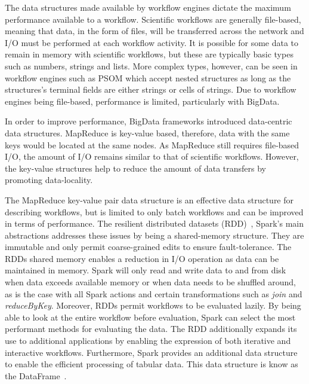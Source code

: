 \documentclass{report}
\begin{document}
                The data structures made available by workflow engines dictate
                the maximum performance available to a workflow. Scientific
                workflows are generally file-based, meaning that data, in the 
                form of files, will be 
                transferred across the network and I/O must be
                performed at each workflow activity. It is possible for some 
                data to remain in memory with scientific workflows, but these 
                are typically basic types such as numbers, strings and lists.
                More complex types, however, can be seen in workflow engines 
                such as PSOM which accept nested structures as long as the
                structures's terminal fields are either strings or cells of 
                strings. Due to workflow engines being file-based, performance
                is limited, particularly with BigData.
                
                In order to improve performance, BigData frameworks introduced
                data-centric data structures. MapReduce is key-value based, 
                therefore, data with the same keys would be located at the
                same nodes. As MapReduce still requires file-based I/O, the 
                amount of I/O remains similar to that of scientific workflows. 
                However, the key-value structures help to reduce the amount 
                of data transfers by promoting data-locality.

                The MapReduce key-value pair data structure is an effective 
                data structure for describing workflows, but is limited to only
                batch workflows and can be improved in terms of performance. 
                The resilient distributed datasets 
                (RDD)~\cite{Zaharia:2012:RDD:2228298.2228301}, Spark's main
                abstractions addresses these 
                issues by being a shared-memory structure. They 
                are immutable and only permit coarse-grained edits to ensure 
                fault-tolerance. The RDDs shared memory enables a reduction in
                I/O operation as data can be maintained in memory. Spark will only read 
                and write data to and from disk when data exceeds available 
                memory or when data needs to be shuffled around, as is the case
                with all Spark actions and certain transformations such as 
                \textit{join} and \textit{reduceByKey}. Moreover, RDDs permit
                workflows to be evaluated lazily. By being able to look at the
                entire workflow before evaluation, Spark can select the most
                performant methods for evaluating the data. 
                The RDD additionally expands its use to additional applications
                by enabling the expression of both iterative and interactive
                workflows. Furthermore, Spark provides an additional data 
                structure to enable the efficient processing of tabular data.
                This data structure is know as the 
                DataFrame~\cite{Armbrust:2015:SSR:2723372.2742797}.
\end{document}
